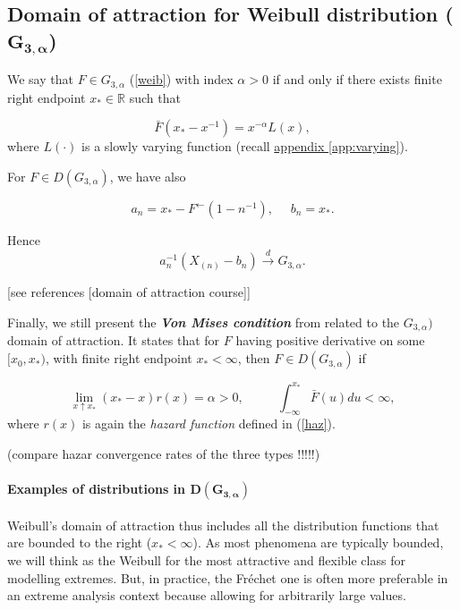 \documentclass[11pt,a4paper,openany ]{book}
\begin{document}
\subsection*{Domain of attraction for Weibull distribution ($\mathbf{G_{3,\alpha}}$) }
We say  that $F\in G_{3,\alpha}$ (\ref{weib}) with index $\alpha>0$ if and only if there exists finite right endpoint $x_*\in\mathbb{R}$ such that 

\begin{equation}
\bar{F}(x_*-x^{-1})=x^{-\alpha}L(x),
\end{equation}
where $L(\cdot)$ is a slowly varying function (recall \hyperref[app:varying]{appendix \ref{app:varying}}).

For $F\in D(G_{3,\alpha})$, we have also

\begin{equation*}
a_n=x_*-F^{\leftarrow}(1-n^{-1}), \ \  \ \ \ \ b_n=x_*.
\end{equation*}

Hence
\begin{equation*}
a^{-1}_n(X_{(n)}-b_n)\stackrel{d}{\rightarrow}G_{3,\alpha}.
\end{equation*}

[see references [domain of attraction course]]

Finally, we still present the \emph{\textbf{Von Mises condition}} from \cite{falk_von_1993} related to the $G_{3,\alpha})$ domain of attraction. It states that for $F$ having positive derivative on some $[x_0,x_*)$, with finite right endpoint $x_*<\infty$, then $F\in D(G_{3,\alpha})$ if

\begin{equation}
\displaystyle{\lim_{ x  \uparrow  x_*}}(x_*-x)r(x)=\alpha >0, \ \ \ \ \ \ \ \ \ \     \ \
\int^{x_*}_{-\infty} \bar{F}(u)du<\infty,
\end{equation}
where $r(x)$ is again the \emph{hazard function} defined in (\ref{haz}).

(compare hazar convergence rates of the three types !!!!!)

\paragraph*{Examples of distributions in $\boldsymbol{D(G_{3,\alpha})}$} Weibull's domain of attraction thus includes all the distribution functions that are bounded to the right ($x_*<\infty$). As most phenomena are typically bounded, we will think as the Weibull for the most attractive and flexible class for modelling extremes. But, in practice, the Fréchet one is often more preferable in an extreme analysis context because allowing for arbitrarily large values.
\newline
\end{document}

